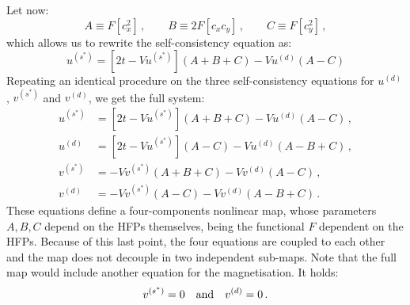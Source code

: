 Let now:
\begin{equation}\label{appeq:saf-ABC-def}
	A \equiv F\left[c_x^2\right] \, ,
	\qquad
	B \equiv 2F\left[c_x c_y\right] \, ,
	\qquad
	C \equiv F\left[c_y^2\right] \, ,
\end{equation}
which allows us to rewrite the self-consistency equation as:
\[
u^{(s^*)} =
\left[2t - Vu^{(s^*)}\right] (A+B+C) -  Vu^{(d)} (A-C)
\]
Repeating an identical procedure on the three self-consistency equations for $u^{(d)}$, $v^{(s^*)}$ and $v^{(d)}$, we get the full system:
\begin{align}
	u^{(s^*)} &=
	\left[2t - Vu^{(s^*)}\right] (A+B+C) -  Vu^{(d)} (A-C) \, , \label{appeq:saf-uS-sc-ABC} \\
	u^{(d)} &=
	\left[2t - Vu^{(s^*)}\right] (A-C) -  Vu^{(d)} (A-B+C) \, , \label{appeq:saf-ud-sc-ABC} \\
	v^{(s^*)} &=
	- Vv^{(s^*)} (A+B+C) -  Vv^{(d)} (A-C) \, , \label{appeq:saf-vS-sc-ABC} \\
	v^{(d)} &=
	- Vv^{(s^*)} (A-C) -  Vv^{(d)} (A-B+C) \, . \label{appeq:saf-vd-sc-ABC}
\end{align}
These equations define a four-components nonlinear map, whose parameters $A,B,C$ depend on the HFPs themselves, being the functional $F$ dependent on the HFPs. Because of this last point, the four equations are coupled to each other and the map does not decouple in two independent sub-maps. Note that the full map would include another equation for the magnetisation. It holds:
\begin{equation}\label{appeq:af-vs*-vd-constraint}
	v^{(s^*)} = 0
	\qq{and}
	v^{(d)} = 0 \, .
\end{equation}

